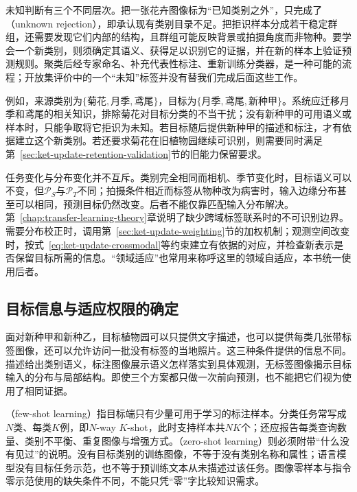 未知判断有三个不同层次。把一张花卉图像标为“已知类别之外”，只完成了（unknown rejection），即承认现有类别目录不足。把拒识样本分成若干稳定群组，还需要发现它们内部的结构，且群组可能反映背景或拍摄角度而非物种。要学会一个新类别，则须确定其语义、获得足以识别它的证据，并在新的样本上验证预测规则。聚类后经专家命名、补充代表性标注、重新训练分类器，是一种可能的流程；开放集评价中的一个“未知”标签并没有替我们完成后面这些工作。

例如，来源类别为$\{\text{菊花},\text{月季},\text{鸢尾}\}$，目标为$\{\text{月季},\text{鸢尾},\text{新种甲}\}$。系统应迁移月季和鸢尾的相关知识，排除菊花对目标分类的不当干扰；没有新种甲的可用语义或样本时，只能争取将它拒识为未知。若目标随后提供新种甲的描述和标注，才有依据建立这个新类别。若还要求菊花在旧植物园继续可识别，则需要同时满足第~\ref{sec:ket-update-retention-validation}节的旧能力保留要求。

任务变化与分布变化并不互斥。类别完全相同而相机、季节变化时，目标语义可以不变，但$\mathcal P_S$与$\mathcal P_T$不同；拍摄条件相近而标签从物种改为病害时，输入边缘分布甚至可以相同，预测目标仍然改变。后者不能仅靠匹配输入分布解决。第~\ref{chap:transfer-learning-theory}章说明了缺少跨域标签联系时的不可识别边界。需要分布校正时，调用第~\ref{sec:ket-update-weighting}节的加权机制；观测空间改变时，按式~\eqref{eq:ket-update-crossmodal}等约束建立有依据的对应，并检查新表示是否保留目标所需的信息。“领域适应”也常用来称呼这里的领域自适应，本书统一使用后者。

\subsection{目标信息与适应权限的确定}
\label{sec:ket-transfer-evidence}

面对新种甲和新种乙，目标植物园可以只提供文字描述，也可以提供每类几张带标签图像，还可以允许访问一批没有标签的当地照片。这三种条件提供的信息不同。描述给出类别语义，标注图像展示语义怎样落实到具体观测，无标签图像揭示目标输入的分布与局部结构。即使三个方案都只做一次前向预测，也不能把它们视为使用了相同证据。

（few-shot learning）指目标端只有少量可用于学习的标注样本。分类任务常写成$N$类、每类$K$例，即$N$-way $K$-shot，此时支持样本共$NK$个；还应报告每类查询数量、类别不平衡、重复图像与增强方式。（zero-shot learning）则必须附带“什么没有见过”的说明。没有目标类别的训练图像，不等于没有类别名称和属性；语言模型没有目标任务示范，也不等于预训练文本从未描述过该任务。图像零样本与指令零示范使用的缺失条件不同，不能只凭“零”字比较知识需求。

